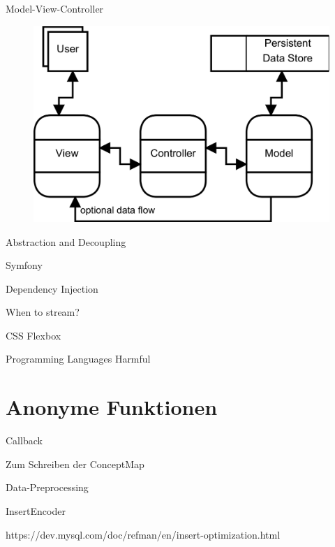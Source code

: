\section{}

\newpage 

Model-View-Controller \citep[Seite 176f]{voorhees2020guide}

\begin{figure}[H]
    \centering
    \includegraphics[width=.7\linewidth]{../img/mvc.png}
    \caption{\citep[Seite 177]{voorhees2020guide}}
\end{figure}

Abstraction and Decoupling

Symfony \citep{potencier2022symfony}

Dependency Injection \citep{seemann2019dependency}

When to stream? \citep{braaksma2014streaming}

CSS Flexbox \citep{flexbox-csstricks}

Programming Languages Harmful \citep{janssenscan}

\section{Anonyme Funktionen}

Callback

Zum Schreiben der ConceptMap

Data-Preprocessing

InsertEncoder

https://dev.mysql.com/doc/refman/en/insert-optimization.html

